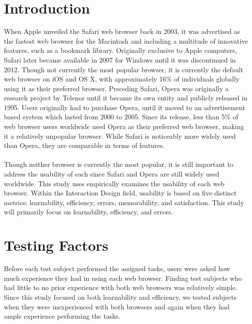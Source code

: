 \documentclass{article}
\begin{document}
\section{Introduction} When Apple unveiled the Safari web browser back in 2003, it was advertised as the fastest web browser for the Macintosh and including a multitude of innovative features, such as a bookmark library. Originally exclusive to Apple computers, Safari later became available in 2007 for Windows until it was discontinued in 2012. Though not currently the most popular browser, it is currently the default web browser on iOS and OS X, with approximately 16\% of individuals globally using it as their preferred browser. Preceding Safari, Opera was originally a research project by Telenor until it became its own entity and publicly released in 1995. Users originally had to purchase Opera, until it moved to an advertisement based system which lasted from 2000 to 2005. Since its release, less than 5\% of web browser users worldwide used Opera as their preferred web browser, making it a relatively unpopular browser. While Safari is noticeably more widely used than Opera, they are comparable in terms of features.\\
\\
\indent Though neither browser is currently the most popular, it is still important to address the usability of each since Safari and Opera are still widely used worldwide. This study uses empirically examines the usability of each web browser. Within the Interaction Design field, usability is based on five distinct metrics: learnability, efficiency, errors, memorability, and satisfaction. This study will primarily focus on learnability, efficiency, and errors.

\section{Testing Factors} Before each test subject performed the assigned tasks, users were asked how much experience they had in using each web browser. Finding test subjects who had little to no prior experience with both web browsers was relatively simple. Since this study focused on both learnability and efficiency, we tested subjects when they were inexperienced with both browsers and again when they had ample experience performing the tasks.
\end{document}
